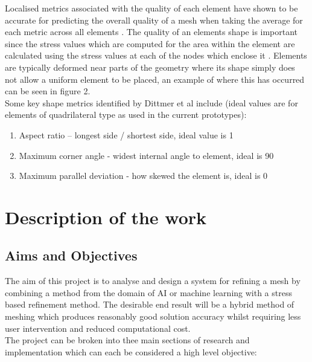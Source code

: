 \documentclass{article}
\begin{document}
\noindent
Localised metrics associated with the quality of each element have shown to be accurate for predicting the overall quality of a mesh when taking the average for each metric across all elements \cite{DittmerMeshQualityMet}. The quality of an elements shape is important since the stress values which are computed for the area within the element are calculated using the stress values at each of the nodes which enclose it \cite{IntroductionToFE}. Elements are typically deformed near parts of the geometry where its shape simply does not allow a uniform element to be placed, an example of where this has occurred can be seen in figure 2.\\ 

\noindent
Some key shape metrics identified by Dittmer et al include (ideal values are for elements of quadrilateral type as used in  the current prototypes):

\begin{enumerate}[label=\Alph*]
\item Aspect ratio – longest side / shortest side, ideal value is 1
\item Maximum corner angle - widest internal angle to element, ideal is 90\degree
\item Maximum parallel deviation - how skewed the element is, ideal is 0\degree
\end{enumerate}

\section{Description of the work}
\subsection{Aims and Objectives}
The aim of this project is to analyse and design a system for refining a mesh by combining a method from the domain of AI or machine learning with a stress based refinement method. The desirable end result will be a hybrid method of meshing which produces reasonably good solution accuracy whilst requiring less user intervention and reduced computational cost.\\

\noindent
The project can be broken into thee main sections of research and implementation which can each be considered a high level objective:\\ 
\end{document}
